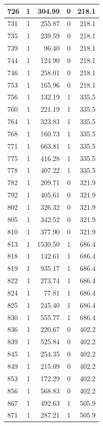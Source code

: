 \documentclass[
  spanish,
  12pt,
]{book}
\begin{document}
\begin{tabular}{l|r|r|r|r}
\hline
726 & 1 & 304.99 & 0 & 218.1\\
\hline
731 & 1 & 255.87 & 0 & 218.1\\
\hline
735 & 1 & 239.59 & 0 & 218.1\\
\hline
739 & 1 & 96.40 & 0 & 218.1\\
\hline
744 & 1 & 124.90 & 0 & 218.1\\
\hline
746 & 1 & 258.01 & 0 & 218.1\\
\hline
753 & 1 & 165.96 & 0 & 218.1\\
\hline
756 & 1 & 132.19 & 1 & 335.5\\
\hline
760 & 1 & 221.19 & 1 & 335.5\\
\hline
764 & 1 & 323.83 & 1 & 335.5\\
\hline
768 & 1 & 160.73 & 1 & 335.5\\
\hline
771 & 1 & 663.81 & 1 & 335.5\\
\hline
775 & 1 & 416.28 & 1 & 335.5\\
\hline
778 & 1 & 407.22 & 1 & 335.5\\
\hline
782 & 1 & 209.71 & 0 & 321.9\\
\hline
792 & 1 & 405.61 & 0 & 321.9\\
\hline
802 & 1 & 326.32 & 0 & 321.9\\
\hline
805 & 1 & 342.52 & 0 & 321.9\\
\hline
810 & 1 & 377.90 & 0 & 321.9\\
\hline
813 & 1 & 1530.50 & 1 & 686.4\\
\hline
818 & 1 & 142.61 & 1 & 686.4\\
\hline
819 & 1 & 935.17 & 1 & 686.4\\
\hline
822 & 1 & 273.74 & 1 & 686.4\\
\hline
824 & 1 & 77.81 & 1 & 686.4\\
\hline
825 & 1 & 245.40 & 1 & 686.4\\
\hline
830 & 1 & 555.77 & 1 & 686.4\\
\hline
836 & 1 & 220.67 & 0 & 402.2\\
\hline
839 & 1 & 525.84 & 0 & 402.2\\
\hline
845 & 1 & 254.35 & 0 & 402.2\\
\hline
849 & 1 & 215.09 & 0 & 402.2\\
\hline
853 & 1 & 172.29 & 0 & 402.2\\
\hline
856 & 1 & 568.83 & 0 & 402.2\\
\hline
867 & 1 & 492.63 & 1 & 505.9\\
\hline
871 & 1 & 287.21 & 1 & 505.9\\

\end{tabular}
\end{document}
